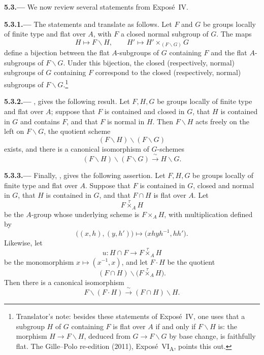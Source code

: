 
\medskip
{}\label{par:sga3-VIA-5.3}%
\noindent\textbf{5.3.---}
We now review several statements from Expos\'e~IV.

\medskip
{}\label{par:sga3-VIA-5.3.1}%
\noindent\textbf{5.3.1.---}
The statements  and  translate as follows.
Let \(F\) and \(G\) be groups locally of finite type and flat over
\(A\), with \(F\) a closed normal subgroup of \(G\). The maps
\[
  H\longmapsto F\backslash H,
  \qquad
  H'\longmapsto H'\times_{(F\backslash G)}G
\]
define a bijection between the flat \(A\)-subgroups of \(G\)
containing \(F\) and the flat \(A\)-subgroups of \(F\backslash G\).
Under this bijection, the closed (respectively, normal) subgroups of
\(G\) containing \(F\) correspond to the closed (respectively,
normal) subgroups of \(F\backslash G\).\footnote{Translator's note: besides these statements of Exposé~IV, one uses that a
subgroup \(H\) of \(G\) containing \(F\) is flat over \(A\) if and only if \(F\backslash H\) is: the
morphism \(H\to F\backslash H\), deduced from \(G\to F\backslash G\) by base change, is faithfully flat.
The Gille--Polo re-edition (2011), Exposé~VI\textsubscript{A}, points this out.}%

\medskip
{}\label{par:sga3-VIA-5.3.2}%
\noindent\textbf{5.3.2.---}
, gives the following result. Let
\(F,H,G\) be groups locally of finite type and flat over \(A\); suppose
that \(F\) is contained and closed in \(G\), that \(H\) is contained in \(G\)
and contains \(F\), and that \(F\) is normal in \(H\). Then
\(F\backslash H\) acts freely on the left on \(F\backslash G\), the
quotient scheme
\[
  (F\backslash H)\backslash(F\backslash G)
\]
exists, and there is a canonical isomorphism of \(G\)-schemes
\[
  (F\backslash H)\backslash(F\backslash G)
    \xrightarrow{\ \sim\ }
  H\backslash G.
\]

\medskip
{}\label{par:sga3-VIA-5.3.3}%
\noindent\textbf{5.3.3.---}
Finally, , gives the following assertion. Let
\(F,H,G\) be groups locally of finite type and flat over \(A\).
Suppose that \(F\) is contained in \(G\), closed and normal in \(G\),
that \(H\) is contained in \(G\), and that \(F\cap H\) is flat over
\(A\). Let
\[
  F\mathbin{\overset{\tau}{\times}}_A H
\]
be the \(A\)-group whose underlying scheme is \(F\times_AH\), with
multiplication defined by
\[
  \bigl((x,h),(y,h')\bigr)
    \longmapsto
  \bigl(xhyh^{-1},hh'\bigr).
\]
Likewise, let
\[
  u:H\cap F\longrightarrow
    F\mathbin{\overset{\tau}{\times}}_A H
\]
be the monomorphism \(x\mapsto(x^{-1},x)\), and let \(F\cdot H\) be
the quotient
\[
  (F\cap H)\backslash
    \bigl(F\mathbin{\overset{\tau}{\times}}_A H\bigr).
\]
Then there is a canonical isomorphism
\[
  F\backslash(F\cdot H)
    \xrightarrow{\ \sim\ }
  (F\cap H)\backslash H.
\]
